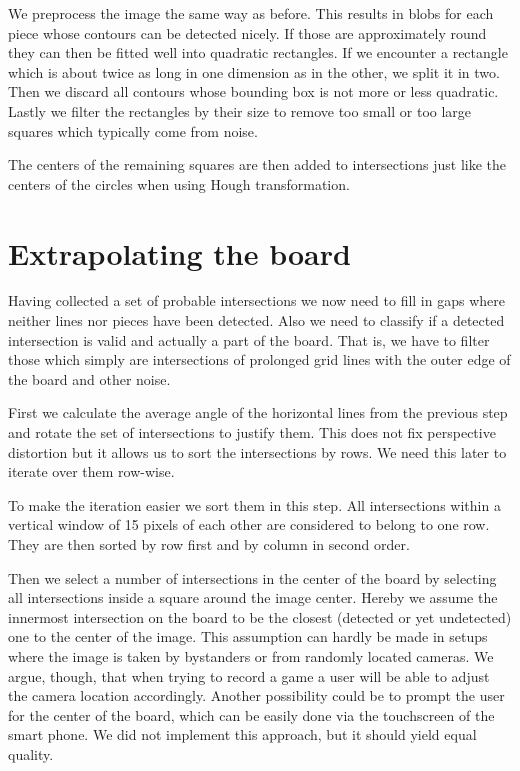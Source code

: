 	We preprocess the image the same way as before. This results in blobs for each piece whose contours can be detected nicely. If those are approximately round they can then be fitted well into quadratic rectangles. If we encounter a rectangle which is about twice as long in one dimension as in the other, we split it in two. Then we discard all contours whose bounding box is not more or less quadratic. Lastly we filter the rectangles by their size to remove too small or too large squares which typically come from noise.

	The centers of the remaining squares are then added to intersections just like the centers of the circles when using Hough transformation.

	\section{Extrapolating the board}
	\label{detector-calculate}
	Having collected a set of probable intersections we now need to fill in gaps where neither lines nor pieces have been detected. Also we need to classify if a detected intersection is valid and actually a part of the board. That is, we have to filter those which simply are intersections of prolonged grid lines with the outer edge of the board and other noise.

	First we calculate the average angle of the horizontal lines from the previous step and rotate the set of intersections to justify them. This does not fix perspective distortion but it allows us to sort the intersections by rows. We need this later to iterate over them row-wise.

	To make the iteration easier we sort them in this step. All intersections within a vertical window of 15 pixels of each other are considered to belong to one row. They are then sorted by row first and by column in second order.

	Then we select a number of intersections in the center of the board by selecting all intersections inside a square around the image center. Hereby we assume the innermost intersection on the board to be the closest (detected or yet undetected) one to the center of the image. This assumption can hardly be made in setups where the image is taken by bystanders or from randomly located cameras. We argue, though, that when trying to record a game a user will be able to adjust the camera location accordingly. Another possibility could be to prompt the user for the center of the board, which can be easily done via the touchscreen of the smart phone. We did not implement this approach, but it should yield equal quality.

